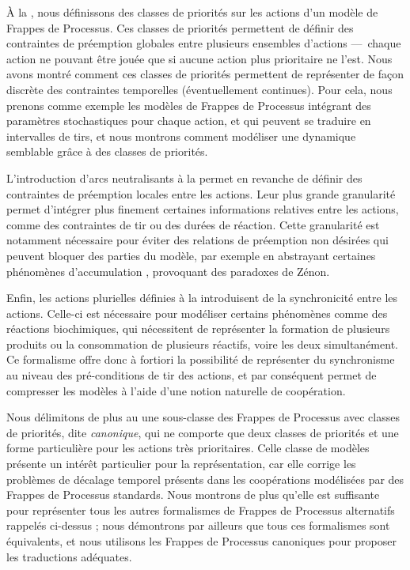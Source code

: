À la , nous définissons des classes de priorités sur les actions
d'un modèle de Frappes de Processus.
Ces classes de priorités permettent de définir des contraintes de préemption globales
entre plusieurs ensembles d'actions ---~chaque action ne pouvant être jouée que si
aucune action plus prioritaire ne l'est.
Nous avons montré comment ces classes de priorités permettent de représenter de façon
discrète des contraintes temporelles (éventuellement continues).
Pour cela, nous prenons comme exemple les modèles de Frappes de Processus intégrant
des paramètres stochastiques pour chaque action,
et qui peuvent se traduire en intervalles de tirs,
et nous montrons comment modéliser une dynamique semblable grâce à des classes de priorités.

L'introduction d'arcs neutralisants à la  permet en revanche de définir
des contraintes de préemption locales entre les actions.
Leur plus grande granularité permet d'intégrer plus finement certaines informations
relatives entre les actions, comme des contraintes de tir ou des durées de réaction.
Cette granularité est notamment nécessaire pour éviter des relations de préemption
non désirées qui peuvent bloquer des parties du modèle,
par exemple en abstrayant certaines phénomènes d'accumulation ,
provoquant des paradoxes de Zénon.

Enfin, les actions plurielles définies à la  introduisent de la
synchronicité entre les actions.
Celle-ci est nécessaire pour modéliser certains phénomènes comme des réactions biochimiques,
qui nécessitent de représenter la formation de plusieurs produits ou la consommation de plusieurs
réactifs, voire les deux simultanément.
Ce formalisme offre donc à fortiori la possibilité de représenter du synchronisme au niveau des
pré-conditions de tir des actions, et par conséquent permet de compresser les modèles
à l'aide d'une notion naturelle de coopération.

\myskip

Nous délimitons de plus au  une sous-classe des Frappes de Processus
avec classes de priorités, dite \emph{canonique},
qui ne comporte que deux classes de priorités et une forme particulière pour les actions
très prioritaires.
Celle classe de modèles présente un intérêt particulier pour la représentation,
car elle corrige les problèmes de décalage temporel présents
dans les coopérations modélisées par des Frappes de Processus standards.
Nous montrons de plus qu'elle est suffisante pour représenter tous les autres
formalismes de Frappes de Processus alternatifs rappelés ci-dessus ;
nous démontrons par ailleurs que tous ces formalismes sont équivalents,
et nous utilisons les Frappes de Processus canoniques pour proposer
les traductions adéquates.

